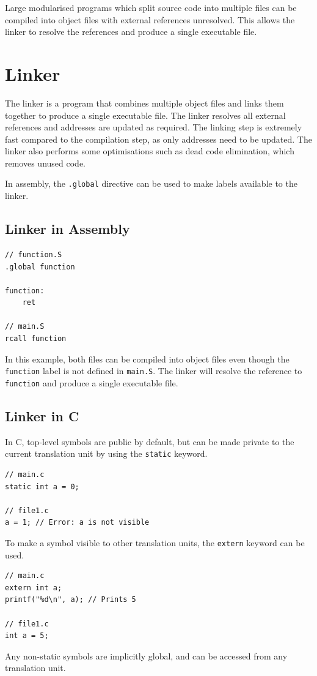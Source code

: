 \documentclass[a4paper]{report}
\begin{document}
Large modularised programs which split source code
into multiple files can be compiled into object files
with external references unresolved. This allows the linker to
resolve the references and produce a single executable file.
\section{Linker}
The linker is a program that combines multiple object files and links them
together to produce a single executable file. The linker resolves all
external references and addresses are updated as required. The linking step is
extremely fast compared to the compilation step, as only addresses
need to be updated. The linker also performs some optimisations such as
dead code elimination, which removes unused code.

In assembly, the \texttt{.global} directive can be used to
make labels available to the linker.
\subsection{Linker in Assembly}
\begin{verbatim}
// function.S
.global function

function:
    ret

// main.S
rcall function
\end{verbatim}
In this example, both files can be compiled into object files even though
the \texttt{function} label is not defined in \texttt{main.S}.
The linker will resolve the reference to \texttt{function} and
produce a single executable file.
\subsection{Linker in C}
In C, top-level symbols are public by default, but can be made private
to the current translation unit by using the \texttt{static} keyword.
\begin{verbatim}
// main.c
static int a = 0;

// file1.c
a = 1; // Error: a is not visible
\end{verbatim}
To make a symbol visible to other translation units, the \texttt{extern} keyword
can be used.
\begin{verbatim}
// main.c
extern int a;
printf("%d\n", a); // Prints 5

// file1.c
int a = 5;
\end{verbatim}
Any non-static symbols are implicitly global, and can be accessed from any translation unit.
\end{document}
